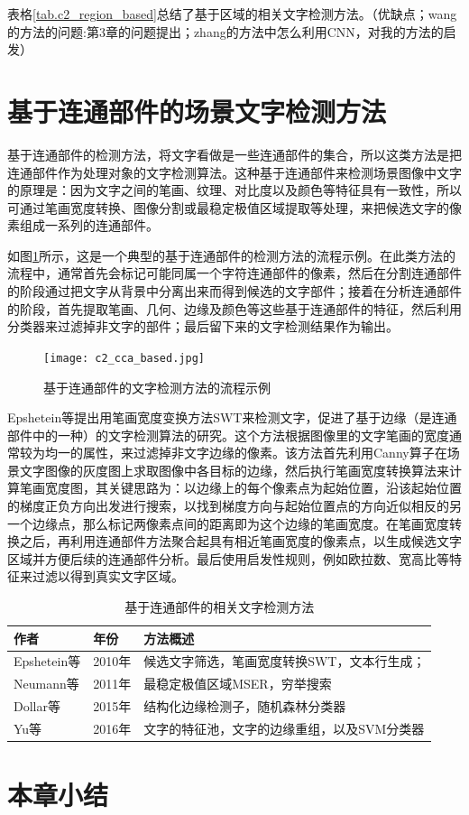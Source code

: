     表格\ref{tab.c2_region_based}总结了基于区域的相关文字检测方法。（优缺点；wang的方法的问题:第3章的问题提出；zhang的方法中怎么利用CNN，对我的方法的启发）

    \section{基于连通部件的场景文字检测方法}

    基于连通部件的检测方法，将文字看做是一些连通部件的集合，所以这类方法是把连通部件作为处理对象的文字检测算法。这种基于连通部件来检测场景图像中文字的原理是：因为文字之间的笔画、纹理、对比度以及颜色等特征具有一致性，所以可通过笔画宽度转换、图像分割或最稳定极值区域提取等处理，来把候选文字的像素组成一系列的连通部件。
    
    如图\ref{fig.c2_cca_based}所示，这是一个典型的基于连通部件的检测方法的流程示例。在此类方法的流程中，通常首先会标记可能同属一个字符连通部件的像素，然后在分割连通部件的阶段通过把文字从背景中分离出来而得到候选的文字部件；接着在分析连通部件的阶段，首先提取笔画、几何、边缘及颜色等这些基于连通部件的特征，然后利用分类器来过滤掉非文字的部件；最后留下来的文字检测结果作为输出。

    \begin{figure}[!h]
    \centering
    \texttt{[image: c2\_cca\_based.jpg]}
    \caption{基于连通部件的文字检测方法的流程示例}
    \label{fig.c2_cca_based}
    \end{figure}
    
    Epshetein等\cite{Epshtein2010Detecting}提出用笔画宽度变换方法SWT来检测文字，促进了基于边缘（是连通部件中的一种）的文字检测算法的研究。这个方法根据图像里的文字笔画的宽度通常较为均一的属性，来过滤掉非文字边缘的像素。该方法首先利用Canny算子在场景文字图像的灰度图上求取图像中各目标的边缘，然后执行笔画宽度转换算法来计算笔画宽度图，其关键思路为：以边缘上的每个像素点为起始位置，沿该起始位置的梯度正负方向出发进行搜索，以找到梯度方向与起始位置点的方向近似相反的另一个边缘点，那么标记两像素点间的距离即为这个边缘的笔画宽度。在笔画宽度转换之后，再利用连通部件方法聚合起具有相近笔画宽度的像素点，以生成候选文字区域并方便后续的连通部件分析。最后使用启发性规则，例如欧拉数、宽高比等特征来过滤以得到真实文字区域。

    \begin{table}[!h]
    \centering
    \caption{基于连通部件的相关文字检测方法}
    \begin{tabular}{p{}|p{}| p{}}
    \hline
    作者 & 年份 & 方法概述 \\
    \hline
    Epshetein等\cite{Epshtein2010Detecting} & 2010年 & 候选文字筛选，笔画宽度转换SWT，文本行生成；\\
    Neumann等\cite{Neumann2011Text} & 2011年 &   最稳定极值区域MSER，穷举搜索\\
    Dollar等\cite{Dollar2015Fast} & 2015年 & 结构化边缘检测子，随机森林分类器 \\
    Yu等\cite{Yu2016Scene} & 2016年 & 文字的特征池，文字的边缘重组，以及SVM分类器 \\
    \hline
    \end{tabular}
    \label{tab.c2_connected_component_based}
    \end{table}

    \section{本章小结}

